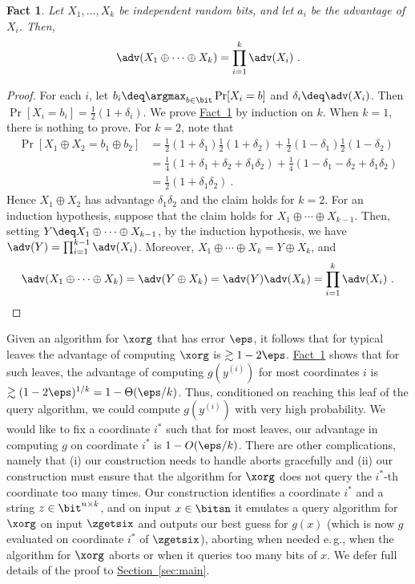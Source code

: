 \documentclass[11pt]{article}
\numberwithin{equation}{section}
\newtheorem{fact}[theorem]{Fact}
\theoremstyle{definition}
\theoremstyle{plain}
\newcommand{\eg}{e.\,g.}
\newcommand{\expref}[2]{\hyperref[#2]{#1~\ref{#2}}}
\begin{document}
\begin{fact}\label{fact:xor-adv}
  Let $X_1,\ldots, X_k$ be independent random bits, and let $a_i$ be
  the advantage of $X_i$.  Then, $$\adv(X_1\oplus \cdots \oplus X_k) =
  \prod_{i=1}^k \adv(X_i)\ .$$
\end{fact}
\begin{proof}
  For each $i$, let $b_i \deq \argmax_{b\in \bit} \Pr[X_i = b]$ and
  $\delta_i \deq \adv(X_i)$.  Then $\Pr[X_i = b_i] =
  \frac{1}{2}(1+\delta_i)$.
  We prove \expref{Fact}{fact:xor-adv} by induction on $k$.  When $k=1$,
  there is nothing to prove.  For $k=2$, note that
  \begin{align*}
    \Pr[X_1 \oplus X_2 = b_1\oplus b_2] &=
    \frac{1}{2}(1+\delta_1)\frac{1}{2}(1+\delta_2) +
    \frac{1}{2}(1-\delta_1)\frac{1}{2}(1-\delta_2) \\
    &= \frac{1}{4}(1+\delta_1+\delta_2 + \delta_1\delta_2) + \frac{1}{4}(1-\delta_1-\delta_2 + \delta_1\delta_2) \\
    &= \frac{1}{2}(1+\delta_1\delta_2)\ .
  \end{align*}
  Hence $X_1\oplus X_2$ has advantage $\delta_1\delta_2$ and the claim
  holds for $k=2$.
  For an induction hypothesis, suppose that the claim holds for
  $X_1\oplus \cdots \oplus X_{k-1}$.  Then, setting $Y \deq X_1 \oplus
  \cdots \oplus X_{k-1}$, by the induction hypothesis, we have $\adv(Y)
  = \prod_{i=1}^{k-1} \adv(X_i)$.  Moreover, $X_1\oplus \cdots \oplus
  X_k = Y\oplus X_k$, and
\begin{equation*}              %
 \adv(X_1 \oplus \cdots \oplus X_k) =
 \adv(Y\oplus X_k) = \adv(Y)\adv(X_k) = \prod_{i=1}^k \adv(X_i)\ . \qedhere
\end{equation*}
\end{proof}


Given an algorithm for $\xorg$ that has error $\eps$, it follows that
for typical leaves the advantage of computing $\xorg$ is
$\gtrsim 1-2\eps$.  \expref{Fact}{fact:xor-adv} shows that for such
leaves, the advantage of computing $g(y^{(i)})$ for most coordinates
$i$ is $\gtrsim (1-2\eps)^{1/k} = 1-\Theta(\eps/k)$.  Thus,
conditioned on reaching this leaf of the query algorithm, we could
compute $g(y^{(i)})$ with very high probability.  %
We would %
like to fix a
coordinate $i^*$ such that for most leaves, our advantage in computing
$g$ on coordinate $i^*$ is $1-O(\eps/k)$.  There are other
complications, namely that (i) our construction needs to handle aborts
gracefully and (ii) our construction must ensure that the algorithm
for $\xorg$ %
does not %
query the $i^*$-th coordinate too many times.  Our
construction identifies a coordinate $i^*$ and a string
$z \in \bit^{n\times k}$, and on input $x \in \bitsn$ it emulates a
query algorithm for $\xorg$ on input $\zgetsix$ and outputs our best
guess for $g(x)$ (which is now $g$ evaluated on coordinate $i^*$ of
$\zgetsix$), aborting when needed \eg, when the algorithm for
$\xorg$ aborts or when it queries too many bits of $x$.  We defer
full details of the proof to \expref{Section}{sec:main}.
\end{document}
